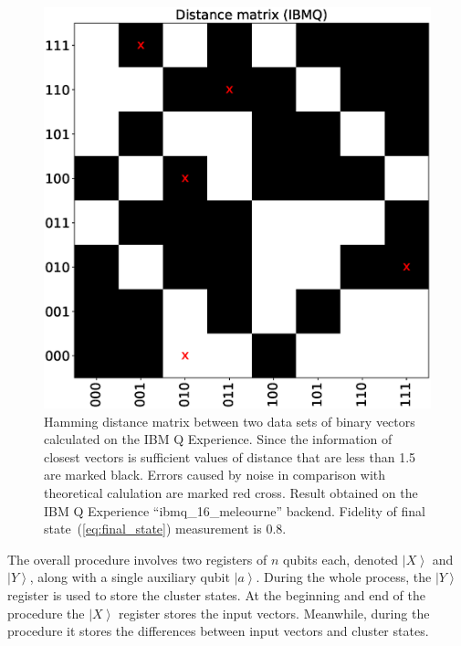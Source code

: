 \documentclass[pra,showkeys,twocolumn,showpacs]{revtex4-1}
\begin{document}
\begin{figure}[t]
	\includegraphics[width=0.95\columnwidth]{distance_matrix.eps}
	\caption{
		Hamming distance matrix between two data sets of binary vectors calculated on the IBM Q Experience. 
		Since the information of closest vectors is sufficient values of distance that are less than 1.5 are marked black. 
		Errors caused by noise in comparison with theoretical calulation are marked red cross.
		Result obtained on the IBM Q Experience ``ibmq\_16\_meleourne'' backend. 
		Fidelity of final state~(\ref{eq:final_state}) measurement is 0.8.
	}
	\label{fig:distance_matrix}
\end{figure}





The overall procedure involves two registers of $n$ qubits each, denoted $\left| X \right\rangle$ and $\left| Y \right\rangle$, along with a single auxiliary qubit $\left| a \right\rangle$. 
During the whole process, the $\left| Y \right\rangle$ register is used to store the cluster states.  
At the beginning and end of the procedure the $\left| X \right\rangle$ register stores the input vectors.  
Meanwhile, during the procedure it stores the differences between input vectors and cluster states.
\end{document}
